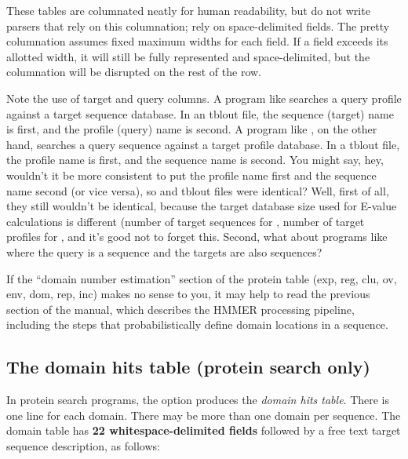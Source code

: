 These tables are columnated neatly for human readability, but do not
write parsers that rely on this columnation; rely on space-delimited
fields. The pretty columnation assumes fixed maximum widths for each
field. If a field exceeds its allotted width, it will still be fully
represented and space-delimited, but the columnation will be disrupted
on the rest of the row.

Note the use of target and query columns. A program like
 searches a query profile against a target sequence
database. In an  tblout file, the sequence (target)
name is first, and the profile (query) name is second. A program like
, on the other hand, searches a query sequence against a
target profile database. In a  tblout file, the profile
name is first, and the sequence name is second. You might say, hey,
wouldn't it be more consistent to put the profile name first and the
sequence name second (or vice versa), so  and
 tblout files were identical? Well, first of all, they
still wouldn't be identical, because the target database size used for
E-value calculations is different (number of target sequences for
, number of target profiles for , and
  it's good not to forget this. Second, what about programs like
   where the query is a sequence and the targets are also
  sequences?

If the ``domain number estimation'' section of the protein table (exp, reg,
clu, ov, env, dom, rep, inc) makes no sense to you, it may help to
read the previous section of the manual, which describes the HMMER
processing pipeline, including the steps that probabilistically define
domain locations in a sequence.

\subsection{The domain hits table (protein search only)}

In protein search programs, the  option produces the
\emph{domain hits table}. There is one line for each domain. There may be more than
one domain per sequence. The domain table has \textbf{22
  whitespace-delimited fields} followed by a free text target sequence
description, as follows:

